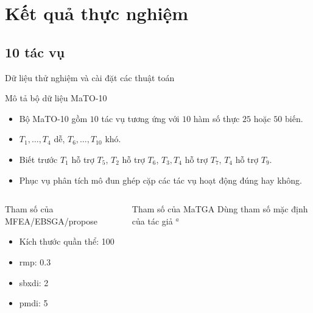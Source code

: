\section{Kết quả thực nghiệm}

\subsection{10 tác vụ}
    \begin{frame}{Dữ liệu thử nghiệm và cài đặt các thuật toán}
        \begin{block}{Mô tả bộ dữ liệu MaTO-10}
            \begin{itemize}
                \item Bộ MaTO-10  gồm $10$ tác vụ tương ứng với $10$ hàm số thực $25$ hoặc $50$ biến.
                \item $T_1, \ldots, T_4$ dễ, $T_6, \ldots, T_{10}$ khó.
                \item Biết trước $T_1$ hỗ trợ $T_5$, $T_2$ hỗ trợ $T_6$, $T_3, T_4$ hỗ trợ $T_7$, $T_4$ hỗ trợ $T_9$.
                \item Phục vụ phân tích mô đun ghép cặp các tác vụ hoạt động đúng hay không.
            \end{itemize}
        \end{block}
        \begin{columns}
            \begin{column}{0.48\textwidth}
                \begin{exampleblock}{Tham số của MFEA/EBSGA/\gls{propose}}
                    \begin{itemize}
                        \item Kích thước quần thể: 100
                        \item rmp: 0.3
                        \item sbxdi: 2
                        \item pmdi: 5
                    \end{itemize}
                \end{exampleblock}
            \end{column}
            \begin{column}{0.48\textwidth}
                \begin{exampleblock}{Tham số của MaTGA}
                    Dùng tham số mặc định của tác giả ${ }^{a}$
                \end{exampleblock}
            \end{column}
        \end{columns}
    \end{frame}

